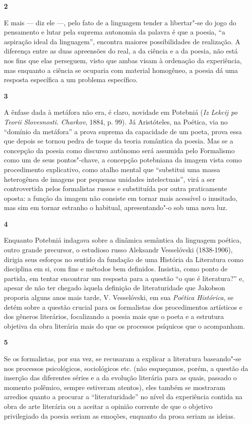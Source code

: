 \textbf{2}

E mais --- diz ele ---, pelo fato de a linguagem tender a libertar"-se do
jogo do pensamento e lutar pela suprema autonomia da palavra é que a
poesia, ``a aspiração ideal da linguagem'', encontra maiores
possibilidades de realização. A diferença entre as duas apreensões do
real, a da ciência e a da poesia, não está nos fins que elas perseguem,
visto que ambas visam à ordenação da experiência, mas enquanto a ciência
se ocuparia com material homogêneo, a poesia dá uma resposta específica
a um problema específico.

\textbf{3}

A ênfase dada à metáfora não era, é claro, novidade em Potebniá
(\emph{Iz Lekcij po Teorii Slovesnosti. Charkov}, 1884, p. 99). Já
Aristóteles, na Poética, via no ``domínio da metáfora'' a prova suprema
da capacidade de um poeta, prova essa que depois se tornou pedra de
toque da teoria romântica da poesia. Mas se a concepção da poesia como
discurso autônomo será assumida pelo Formalismo como um de seus
pontos"-chave, a concepção potebniana da imagem vista como procedimento
explicativo, como atalho mental que ``substitui uma massa heterogênea de
imagens por pequenas unidades intelectuais'', virá a ser controvertida
pelos formalistas russos e substituída por outra praticamente oposta: a
função da imagem não consiste em tornar mais acessível o inusitado, mas
sim em tornar estranho o habitual, apresentando"-o sob uma nova luz.

\textbf{4}

Enquanto Potebniá indagava sobre a dinâmica semântica da linguagem
poética, outro grande precursor, o estudioso russo Aleksandr Vesselóvski
(1838-1906), dirigia seus esforços no sentido da fundação de uma
História da Literatura como disciplina em si, com fins e métodos bem
definidos. Insistia, como ponto de partida, em tentar encontrar um
resposta para a questão ``o que é literatura?'' e, apesar de não ter
chegado àquela definição de literaturidade que Jakobson proporia alguns
anos mais tarde, V. Vesselóvski, em sua \emph{Poética Histórica}, se
detém sobre a questão crucial para os formalistas dos procedimentos
artísticos e dos gêneros literários, focalizando a poesia mais que o
poeta e a estrutura objetiva da obra literária mais do que os processos
psíquicos que o acompanham.

\textbf{5}

Se os formalistas, por sua vez, se recusaram a explicar a literatura
baseando"-se nos processos psicológicos, sociológicos etc. (não
esqueçamos, porém, a questão da inserção das diferentes séries e a da
evolução literária para as quais, passado o momento polêmico, sempre
estiveram atentos), eles também se mostraram arredios quanto a procurar
a ``literaturidade'' no nível da experiência contida na obra de arte
literária ou a aceitar a opinião corrente de que o objetivo privilegiado
da poesia seriam as emoções, enquanto da prosa seriam as ideias.

